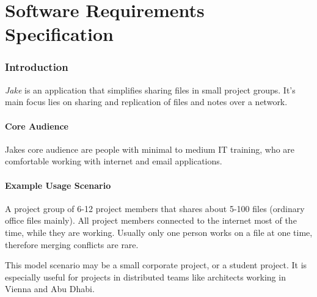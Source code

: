 

\part{Software Requirements Specification}

\section{Introduction}
\emph{Jake} is an application that simplifies sharing files in small project groups. It's main focus lies on sharing and replication of files and notes over a network.

\subsection{Core Audience}
Jakes core audience are people with minimal to medium IT training, who are comfortable working with internet and email applications.

\subsection{Example Usage Scenario}
A project group of 6-12 project members that shares about 5-100 files (ordinary office files mainly). All project members connected to the internet most of the time, while they are working. Usually only one person works on a file at one time, therefore merging conflicts are rare.

This model scenario may be a small corporate project, or a student project. It is especially useful for projects in distributed teams like architects working in Vienna and Abu Dhabi.

